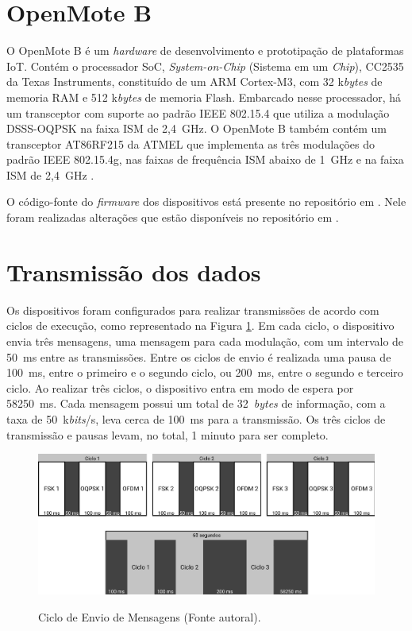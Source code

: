 \section{OpenMote B}
O OpenMote B é um \emph{hardware} de desenvolvimento e prototipação de plataformas IoT. Contém o processador SoC, \emph{System-on-Chip} (Sistema em um \emph{Chip}), CC2535 da Texas Instruments, constituído de um ARM Cortex-M3, com 32 k\emph{bytes} de memoria RAM e 512 k\emph{bytes} de memoria Flash. Embarcado nesse processador, há um transceptor com suporte ao padrão IEEE 802.15.4 que utiliza a modulação DSSS-OQPSK na faixa ISM de 2,4~GHz. O OpenMote B também contém um transceptor AT86RF215 da ATMEL que implementa as três modulações do padrão IEEE 802.15.4g, nas faixas de frequência ISM abaixo de 1~GHz e na faixa ISM de 2,4~GHz \cite{openmoteb-userguide}.

O código-fonte do \emph{firmware} dos dispositivos está presente no repositório em \cite{openmoteb-firmware}. Nele foram realizadas alterações que estão disponíveis no repositório em \cite{openmoteb-gcompi}.

\section{Transmissão dos dados}
Os dispositivos foram configurados para realizar transmissões de acordo com ciclos de execução, como representado na Figura \ref{fig:ciclo_envio}. Em cada ciclo, o dispositivo envia três mensagens, uma mensagem para cada modulação, com um intervalo de 50~ms entre as transmissões. Entre os ciclos de envio é realizada uma pausa de 100~ms, entre o primeiro e o segundo ciclo, ou 200~ms, entre o segundo e terceiro ciclo. Ao realizar três ciclos, o dispositivo entra em modo de espera por 58250~ms. Cada mensagem possui um total de 32~\emph{bytes} de informação, com a taxa de 50~k\emph{bits}/s, leva cerca de 100~ms para a transmissão. Os três ciclos de transmissão e pausas levam, no total, 1 minuto para ser completo.

\begin{figure}[H]
      \centering
      \includegraphics[width=\textwidth]{./sections/textual/chapters/images/metodo_ciclo_envio.png}\\
      \caption{Ciclo de Envio de Mensagens (Fonte autoral).}
      \label{fig:ciclo_envio}
\end{figure}

